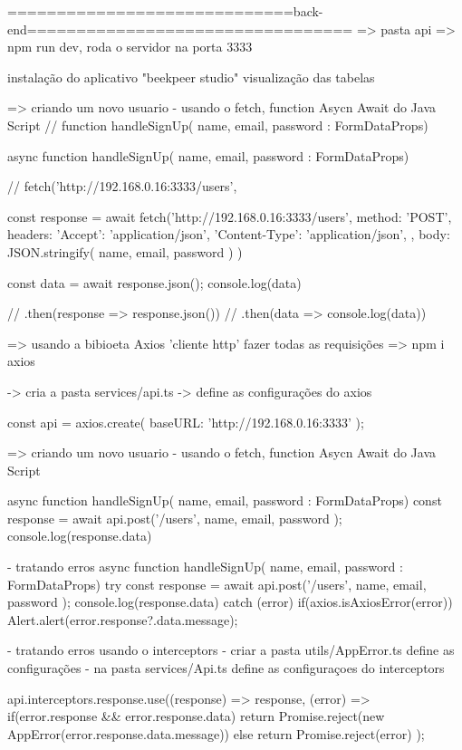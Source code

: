 =============================back-end=================================
=> pasta api
=> npm run dev, roda o servidor na porta 3333

instalação do aplicativo "beekpeer studio" visualização das tabelas

=> criando um novo usuario
- usando o fetch, function Asycn Await do Java Script 
// function handleSignUp({ name, email, password }: FormDataProps) {
    async function handleSignUp({ name, email, password }: FormDataProps) {
    // fetch('http://192.168.0.16:3333/users', {
       const response = await fetch('http://192.168.0.16:3333/users', {
            method: 'POST',
            headers: {
                'Accept': 'application/json',
                'Content-Type': 'application/json',
            },
            body: JSON.stringify({ name, email, password })
        })

        const data = await response.json();
        console.log(data)
            
        // .then(response => response.json())
        // .then(data => console.log(data))
    }

=> usando a bibioeta Axios 'cliente http' fazer todas as requisições
=> npm i axios

-> cria a pasta services/api.ts
-> define as configurações do axios

const api = axios.create({
    baseURL: 'http://192.168.0.16:3333'
});

=> criando um novo usuario
- usando o fetch, function Asycn Await do Java Script 

async function handleSignUp({ name, email, password }: FormDataProps) {
    const response = await api.post('/users', { name, email, password });
    console.log(response.data)
}

- tratando erros
async function handleSignUp({ name, email, password }: FormDataProps) {
        try{
            const response = await api.post('/users', { name, email, password });
            console.log(response.data)
        } catch (error) {
            if(axios.isAxiosError(error)) {
                Alert.alert(error.response?.data.message);
            }
        }
}

- tratando erros usando o interceptors
- criar a pasta utils/AppError.ts define as configurações
- na pasta services/Api.ts define as configuraçoes do interceptors

api.interceptors.response.use((response) => response, (error) => {
    if(error.response && error.response.data) {
      return Promise.reject(new AppError(error.response.data.message))
    } else {
      return Promise.reject(error)
    }
});

}}
